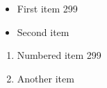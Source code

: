 \documentclass{article}
\begin{document}
\begin{itemize}
\item First item 299
\item Second item
\end{itemize}
\begin{enumerate}
\item Numbered item 299
\item Another item
\end{enumerate}
\end{document}
